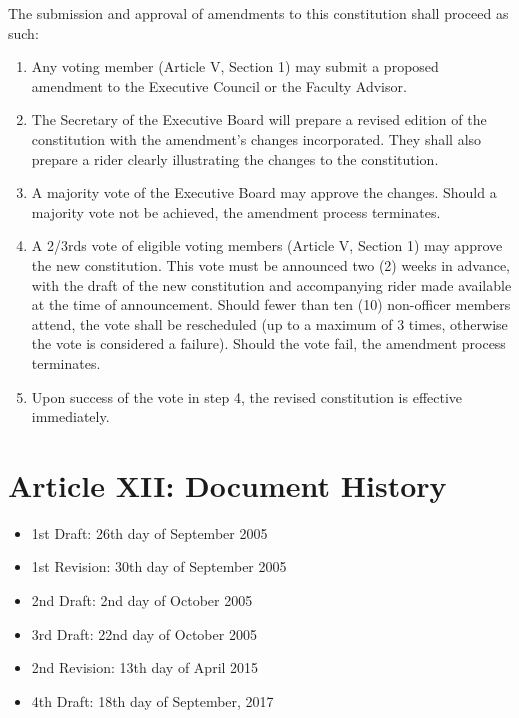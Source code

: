 \documentclass{article}
\begin{document}
The submission and approval of amendments to this constitution shall
proceed as such: 
\begin{enumerate}
\item
    Any voting member (Article V, Section 1) may submit a proposed amendment to the Executive Council or the Faculty Advisor. 
\item
    The Secretary of the Executive Board will prepare a revised edition of the constitution with the amendment's changes incorporated. They shall also prepare a rider clearly illustrating the changes to the constitution.
\item
    A majority vote of the Executive Board may approve the changes. Should a majority vote not be achieved, the amendment process terminates.
\item
    A 2/3rds vote of eligible voting members (Article V, Section 1) may approve the new constitution. This vote must be announced two (2) weeks in advance, with the draft of the new constitution and accompanying rider made available at the time of announcement. Should fewer than ten (10) non-officer members attend, the vote shall be rescheduled (up to a maximum of 3 times, otherwise the vote is considered a failure). Should the vote fail, the amendment process terminates.
\item
    Upon success of the vote in step 4, the revised constitution is effective immediately.
\end{enumerate}

\newpage

\section{Article XII: Document History}

\begin{itemize}
\item
  1st Draft: 26th day of September 2005
\item
  1st Revision: 30th day of September 2005
\item
  2nd Draft: 2nd day of October 2005
\item
  3rd Draft: 22nd day of October 2005
\item
  2nd Revision: 13th day of April 2015
\item
  4th Draft: 18th day of September, 2017
\end{itemize}
\end{document}
